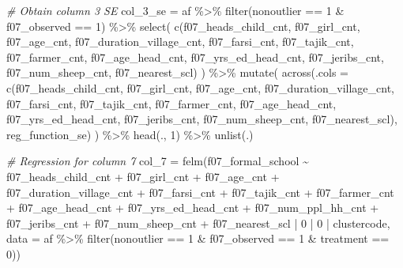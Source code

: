 \documentclass[
]{article}
\newenvironment{Shaded}{\begin{snugshade}}{\end{snugshade}}
\newcommand{\AttributeTok}[1]{\textcolor[rgb]{0.77,0.63,0.00}{#1}}
\newcommand{\CommentTok}[1]{\textcolor[rgb]{0.56,0.35,0.01}{\textit{#1}}}
\newcommand{\DecValTok}[1]{\textcolor[rgb]{0.00,0.00,0.81}{#1}}
\newcommand{\FunctionTok}[1]{\textcolor[rgb]{0.00,0.00,0.00}{#1}}
\newcommand{\NormalTok}[1]{#1}
\newcommand{\OtherTok}[1]{\textcolor[rgb]{0.56,0.35,0.01}{#1}}
\newcommand{\SpecialCharTok}[1]{\textcolor[rgb]{0.00,0.00,0.00}{#1}}
\begin{document}
\begin{Shaded}
\begin{Highlighting}[]
\CommentTok{\# Obtain column 3 SE}
\NormalTok{col\_3\_se }\OtherTok{=}\NormalTok{ af }\SpecialCharTok{\%\textgreater{}\%} 
  \FunctionTok{filter}\NormalTok{(nonoutlier }\SpecialCharTok{==} \DecValTok{1} \SpecialCharTok{\&}\NormalTok{ f07\_observed }\SpecialCharTok{==} \DecValTok{1}\NormalTok{) }\SpecialCharTok{\%\textgreater{}\%} 
  \FunctionTok{select}\NormalTok{(}
    \FunctionTok{c}\NormalTok{(f07\_heads\_child\_cnt, f07\_girl\_cnt, f07\_age\_cnt, f07\_duration\_village\_cnt,}
\NormalTok{                   f07\_farsi\_cnt,  f07\_tajik\_cnt,  f07\_farmer\_cnt, }
\NormalTok{                   f07\_age\_head\_cnt, f07\_yrs\_ed\_head\_cnt, f07\_jeribs\_cnt, }
\NormalTok{                   f07\_num\_sheep\_cnt, f07\_nearest\_scl)}
\NormalTok{  ) }\SpecialCharTok{\%\textgreater{}\%} 
  \FunctionTok{mutate}\NormalTok{(}
  \FunctionTok{across}\NormalTok{(}\AttributeTok{.cols =} \FunctionTok{c}\NormalTok{(f07\_heads\_child\_cnt, f07\_girl\_cnt, f07\_age\_cnt, f07\_duration\_village\_cnt,}
\NormalTok{                   f07\_farsi\_cnt,  f07\_tajik\_cnt,  f07\_farmer\_cnt, }
\NormalTok{                   f07\_age\_head\_cnt, f07\_yrs\_ed\_head\_cnt, f07\_jeribs\_cnt, }
\NormalTok{                   f07\_num\_sheep\_cnt, f07\_nearest\_scl), reg\_function\_se)}
\NormalTok{  ) }\SpecialCharTok{\%\textgreater{}\%} \FunctionTok{head}\NormalTok{(., }\DecValTok{1}\NormalTok{) }\SpecialCharTok{\%\textgreater{}\%} \FunctionTok{unlist}\NormalTok{(.)}

\CommentTok{\# Regression for column 7}
\NormalTok{col\_7 }\OtherTok{=} \FunctionTok{felm}\NormalTok{(f07\_formal\_school }\SpecialCharTok{\textasciitilde{}}\NormalTok{ f07\_heads\_child\_cnt }\SpecialCharTok{+} 
\NormalTok{               f07\_girl\_cnt }\SpecialCharTok{+}\NormalTok{ f07\_age\_cnt }\SpecialCharTok{+}\NormalTok{ f07\_duration\_village\_cnt }\SpecialCharTok{+} 
\NormalTok{               f07\_farsi\_cnt }\SpecialCharTok{+}\NormalTok{ f07\_tajik\_cnt }\SpecialCharTok{+}\NormalTok{ f07\_farmer\_cnt }\SpecialCharTok{+} 
\NormalTok{               f07\_age\_head\_cnt }\SpecialCharTok{+}\NormalTok{ f07\_yrs\_ed\_head\_cnt }\SpecialCharTok{+}\NormalTok{ f07\_num\_ppl\_hh\_cnt }\SpecialCharTok{+} 
\NormalTok{               f07\_jeribs\_cnt }\SpecialCharTok{+}\NormalTok{ f07\_num\_sheep\_cnt }\SpecialCharTok{+}\NormalTok{ f07\_nearest\_scl}
             \SpecialCharTok{|} \DecValTok{0} \SpecialCharTok{|} \DecValTok{0} \SpecialCharTok{|}\NormalTok{ clustercode, }
             \AttributeTok{data =}\NormalTok{ af }\SpecialCharTok{\%\textgreater{}\%} 
               \FunctionTok{filter}\NormalTok{(nonoutlier }\SpecialCharTok{==} \DecValTok{1} \SpecialCharTok{\&}\NormalTok{ f07\_observed }\SpecialCharTok{==} \DecValTok{1} \SpecialCharTok{\&}\NormalTok{ treatment }\SpecialCharTok{==} \DecValTok{0}\NormalTok{))}


\end{Highlighting}
\end{Shaded}
\end{document}
